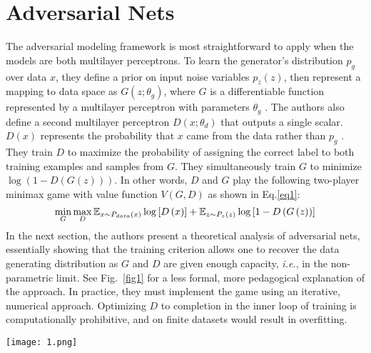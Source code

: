 \documentclass[10pt,twocolumn,letterpaper]{article}
\begin{document}
\section{Adversarial Nets}
The adversarial modeling framework is most straightforward to apply when the models are both
multilayer perceptrons. To learn the generator’s distribution $p_g$ over data $x$, they define a prior on
input noise variables $p_z\left(z\right)$, then represent a mapping to data space as $G\left(z;\theta_g\right)$, where $G$ is a differentiable function represented by a multilayer perceptron with parameters $\theta_g$ . The authors also define a
second multilayer perceptron $D\left(x;\theta_d\right)$ that outputs a single scalar. $D\left(x\right)$ represents the probability
that $x$ came from the data rather than $p_g$ . They train $D$ to maximize the probability of assigning the
correct label to both training examples and samples from $G$. They simultaneously train $G$ to minimize
$\log\left(1-D\left(G\left(z\right)\right)\right)$. In other words, $D$ and $G$ play the following two-player minimax game with
value function $V\left(G,D\right)$ as shown in Eq.\ref{eq1}:
\begin{equation}
 \min_G \max_D \mathbb{E}_{x\sim P_{data}\left(x\right)} \log\left[D\left(x\right)\right] +\\
 \mathbb{E}_{z\sim P_{z}\left(z\right)} \log\left[1-D\left(G\left(z\right)\right)\right]
\label{eq1}
\end{equation}
In the next section, the authors present a theoretical analysis of adversarial nets, essentially showing that
the training criterion allows one to recover the data generating distribution as $G$ and $D$ are given
enough capacity, \textit{i.e.}, in the non-parametric limit. See Fig.~\ref{fig1} for a less formal, more pedagogical
explanation of the approach. In practice, they must implement the game using an iterative, numerical
approach. Optimizing $D$ to completion in the inner loop of training is computationally prohibitive,
and on finite datasets would result in overfitting.
\begin{figure*}[ht]
	\centering
	\texttt{[image: 1.png]}
	\label{fig1}
	\caption{(a)
		Consider an adversarial pair near convergence: $p_g$ is similar to p data and $D$ is a partially accurate classifier.
		(b) In the inner loop of the algorithm D is trained to discriminate samples from data, converging to $D^\ast\left(x\right)=\frac{P_{data}\left(x\right)}{P_{data}\left(x\right)+P_g\left(x\right)}$
		. (c) After an update to $G$, gradient of $D$ has guided $G\left(z\right)$ to flow to regions that are more likely
		to be classified as data. (d) After several steps of training, if $G$ and $D$ have enough capacity, they will reach a
		point at which both cannot improve because $p_g = p_{data}$.}
\end{figure*}
\end{document}

